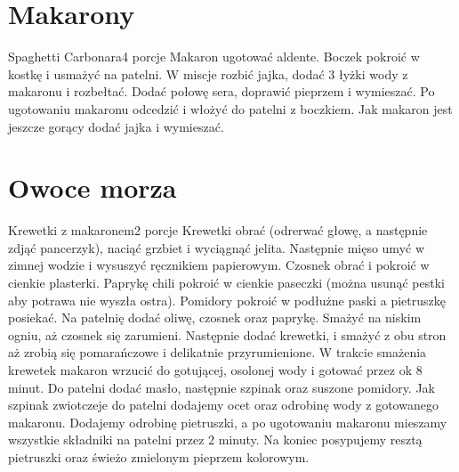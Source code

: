 \documentclass[a4paper,12pt]{article}
\begin{document}
\newpage

\section{Makarony}

\begin{recipe}{Spaghetti Carbonara}{4 porcje}{}
Makaron ugotować aldente. Boczek pokroić w kostkę i usmażyć na patelni. 
W miscje rozbić jajka, dodać 3 łyżki wody z makaronu i rozbełtać. 
Dodać połowę sera, doprawić pieprzem i wymieszać. 
Po ugotowaniu makaronu odcedzić i włożyć do patelni z boczkiem.
Jak makaron jest jeszcze gorący dodać jajka i wymieszać.


\end{recipe}

\section{Owoce morza}

\begin{recipe}{Krewetki z makaronem}{2 porcje}{}
Krewetki obrać (odrerwać głowę, a następnie zdjąć pancerzyk), naciąć grzbiet i wyciągnąć jelita. Następnie mięso umyć w zimnej wodzie i wysuszyć ręcznikiem papierowym.
Czosnek obrać i pokroić w cienkie plasterki. Paprykę chili pokroić w cienkie paseczki (można usunąć pestki aby potrawa nie wyszła ostra).
Pomidory pokroić w podłużne paski a pietruszkę posiekać.
Na patelnię dodać oliwę, czosnek oraz paprykę. Smażyć na niskim ogniu, aż czosnek się zarumieni.
Następnie dodać krewetki, i smażyć z obu stron aż zrobią się pomarańczowe i delikatnie przyrumienione.
\freeform%
W trakcie smażenia krewetek makaron wrzucić do gotującej, osolonej wody i gotować przez ok 8 minut. Do patelni dodać masło, następnie szpinak oraz suszone pomidory. Jak szpinak zwiotczeje do patelni dodajemy ocet oraz odrobinę wody z gotowanego makaronu. Dodajemy odrobinę pietruszki, a po ugotowaniu makaronu mieszamy wszystkie składniki na patelni przez 2 minuty. Na koniec posypujemy resztą pietruszki oraz świeżo zmielonym pieprzem kolorowym.

\end{recipe}
\end{document}
